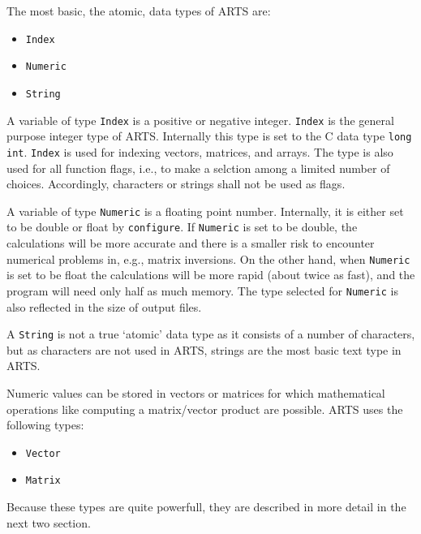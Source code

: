 \label{sec:formats:atomic}
 
The most basic, the atomic, data types of ARTS are:

\begin{itemize}
\item \verb|Index|
\item \verb|Numeric|
\item \verb|String|
\end{itemize}

A variable of type \verb|Index| is a positive or negative integer.
\verb|Index| is the general purpose integer type of ARTS.  Internally
this type is set to the C data type \verb|long int|. \verb|Index| is
used for indexing vectors, matrices, and arrays. The type is also used
for all function flags, i.e., to make a selction among a limited number
of choices. Accordingly, characters or strings shall not be used as
flags.

A variable of type \verb|Numeric| is a floating point number.
Internally, it is either set to be double or float by
\verb|configure|. If \verb|Numeric| is set to be double, the
calculations will be more accurate and there is a smaller risk to
encounter numerical problems in, e.g., matrix inversions.  On the
other hand, when \verb|Numeric| is set to be float the calculations
will be more rapid (about twice as fast), and the program will need
only half as much memory. The type selected for \verb|Numeric| is also
reflected in the size of output files.

A \verb|String| is not a true `atomic' data type as it consists of a
number of characters, but as characters are not used in ARTS, strings
are the most basic text type in ARTS.
  

\label{sec:formats:nummath}
 
Numeric values can be stored in vectors or matrices for which
mathematical operations like computing a matrix/vector product are
possible. ARTS uses the following types:

\begin{itemize}
\item \verb|Vector|
\item \verb|Matrix|
\end{itemize}

Because these types are quite powerfull, they are described in more
detail in the next two section.




